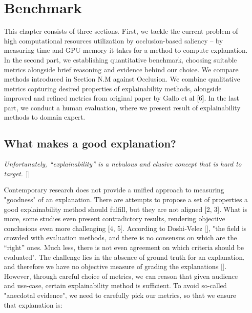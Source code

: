\chapter{Benchmark}

This chapter consists of three sections. First, we tackle the current problem of high computational resources utilization by occlusion-based saliency -- by measuring time and GPU memory it takes for a method to compute explanation. In the second part, we establishing quantitative benchmark, choosing suitable metrics alongside brief reasoning and evidence behind our choice. We compare methods introduced in Section N.M against Occlusion. We combine qualitative metrics capturing desired properties of explainability methods, alongside improved and refined metrics from original paper by Gallo et al [6]. In the last part, we conduct a human evaluation, where we present result of explainability methods to domain expert.

\section{What makes a good explanation?}

\emph{Unfortunately, “explainability” is a nebulous and elusive concept that is hard to target.} []
\newline

\noindent

Contemporary research does not provide a unified approach to measuring "goodness" of an explanation.  There are attempts to propose a set of properties a good explainability method should fulfill, but they are not aligned [2, 3]. What is more, some studies even present contradictory results, rendering objective conclusions even more challenging [4, 5]. According to Doshi-Velez [], "the field is crowded with evaluation methods, and there is no consensus on which are the “right” ones. Much less, there is not even agreement on which criteria should be evaluated". The challenge lies in the absence of ground truth for an explanation, and therefore we have no objective measure of grading the explanations []. However, through careful choice of metrics, we can reason that given audience and use-case, certain explainability method is sufficient. To avoid so-called "anecdotal evidence", we need to carefully pick our metrics, so that we ensure that explanation is:


